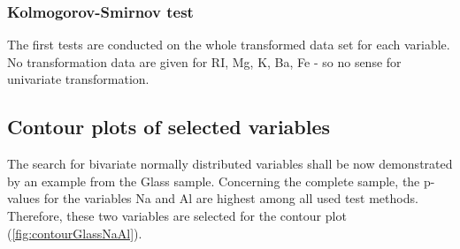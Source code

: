 \documentclass[a4paper, 12pt, titlepage, headsepline, listof = totoc, bibliography = totoc, numbers = noenddot]{scrartcl}
\begin{document}
\subsubsection{Kolmogorov-Smirnov test}

The first tests are conducted on the whole transformed data set for each
variable. No transformation data are given for RI, Mg, K, Ba, Fe - so no sense
for univariate transformation.


%
%
\subsection{Contour plots of selected variables}

The search for bivariate normally distributed variables shall be now demonstrated by an example from the Glass sample. Concerning the complete sample, the p-values for the variables Na and Al are highest among all used test methods. Therefore, these two variables are selected for the contour plot (\ref{fig:contourGlassNaAl}).
\end{document}
